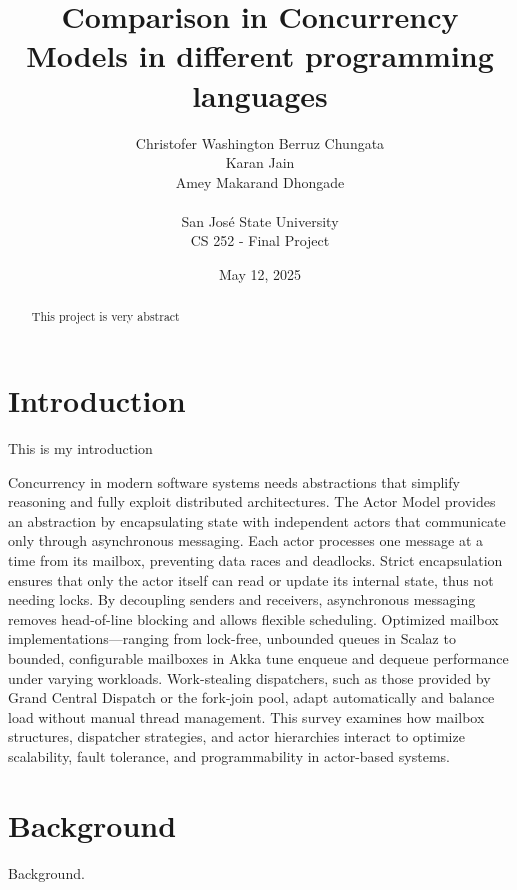 \documentclass[12pt]{article}
\begin{document}
\title{Comparison in Concurrency Models in different programming languages}
\author{
    Christofer Washington Berruz Chungata \\ 
    Karan Jain \\ 
    Amey Makarand Dhongade \\ 
    \\
    San Jos\'{e} State University \\ 
    CS 252 - Final Project
}
\date{May 12, 2025}

\maketitle

\begin{abstract}
This project is very abstract
\end{abstract}

\section{Introduction\label{sec:introduction}}
This is my introduction

Concurrency in modern software systems needs abstractions that simplify reasoning and fully exploit distributed architectures. The Actor Model provides an abstraction by encapsulating state with independent actors that communicate only through asynchronous messaging. Each actor processes one message at a time from its mailbox, preventing data races and deadlocks. Strict encapsulation ensures that only the actor itself can read or update its internal state, thus not  needing locks. By decoupling senders and receivers, asynchronous messaging removes head-of-line blocking and allows flexible scheduling. Optimized mailbox implementations—ranging from lock-free, unbounded queues in Scalaz to bounded, configurable mailboxes in Akka tune enqueue and dequeue performance under varying workloads. Work-stealing dispatchers, such as those provided by Grand Central Dispatch or the fork-join pool, adapt automatically and balance load without manual thread management. This survey examines how mailbox structures, dispatcher strategies, and actor hierarchies interact to optimize scalability, fault tolerance, and programmability in actor-based systems.

\section{Background\label{sec:background}}
Background.







\end{document}
